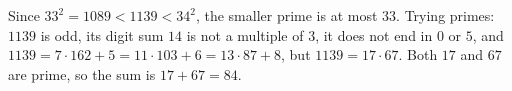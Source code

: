 Since $33^2=1089<1139<34^2$, the smaller prime is at most $33$. Trying primes: $1139$ is odd, its digit sum $14$ is not a multiple of $3$, it does not end in $0$ or $5$, and $1139=7\cdot162+5=11\cdot103+6=13\cdot87+8$, but $1139=17\cdot67$. Both $17$ and $67$ are prime, so the sum is $17+67=\boxed{84}$.
